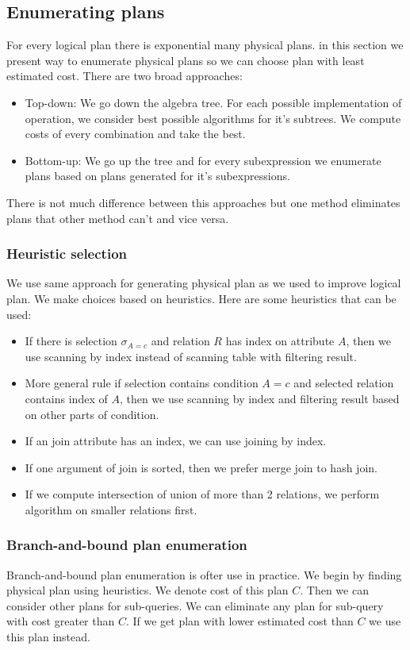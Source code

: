 \subsection{Enumerating plans}
For every logical plan there is exponential many physical plans. in this section we present way to enumerate physical plans so we can choose plan with least estimated cost. There are two broad approaches:
\begin{itemize}
\item Top-down: We go down the algebra tree. For each possible implementation of operation, we consider best possible algorithms for it's subtrees. We compute costs of every combination and take the best.
\item Bottom-up: We go up the tree and for every subexpression we enumerate plans based on plans generated for it's subexpressions.
\end{itemize}

There is not much difference between this approaches but one method eliminates plans that other method can't and vice versa.
\subsubsection{Heuristic selection}

We use same approach for generating physical plan as we used to improve logical plan. We make choices based on heuristics. Here are some heuristics that can be used:

\begin{itemize}
\item If there is selection $\sigma_{A=c}$ and relation $R$ has index on attribute $A$, then we use scanning by index instead of scanning table with filtering result.
\item More general rule if selection contains condition $A=c$ and selected relation contains index of $A$, then we use scanning by index and filtering result based on other parts of condition.
\item If an join attribute has an index, we can use joining by index.
\item If one argument of join is sorted, then we prefer merge join to hash join.
\item If we compute intersection of union of more than 2 relations, we perform algorithm on smaller relations first.
\end{itemize}

\subsubsection{Branch-and-bound plan enumeration}
Branch-and-bound plan enumeration is ofter use in practice. We begin by finding physical plan using heuristics. We denote cost of this plan $C$. Then we can consider other plans for sub-queries. We can eliminate any plan for sub-query with cost greater than $C$. If we get plan with lower estimated cost than $C$ we use this plan instead.

